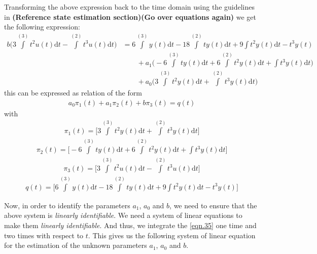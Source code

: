 \documentclass{article}
\begin{document}
Transforming the above expression back to the time domain using the guidelines in \textbf{(Reference state estimation section)(Go over equations again)} we get the following expression:
\begin{equation}\label{eqn.34}
\begin{split}
b\big(3 \int\limits^{(3)} t^2 u(t) \mathrm{d}t - \int\limits^{(2)} t^3 u(t) \mathrm{d}t\big) & = 6\int\limits^{(3)}y(t) \mathrm{d}t - 18\int\limits^{(2)}ty(t)\mathrm{d}t + 9\int t^2y(t)\mathrm{d}t - t^3y(t)  \, \\
&\qquad{}+ a_{1}\big(-6\int\limits^{(3)} ty(t)\mathrm{d}t + 6\int\limits^{(2)}t^2y(t) \mathrm{d}t + \int t^3y(t)\mathrm{d}t\big) \, \\ 
&\qquad{}+ a_{0}\big(3\int\limits^{(3)}t^2y(t)\mathrm{d}t + \int\limits^{(2)}t^3y(t)\mathrm{d}t\big)
\end{split}
\end{equation}
this can be expressed as relation of the form
\begin{equation}\label{eqn.35}
\begin{split}
a_{0}\pi_{1}(t) + a_{1}\pi_{2}(t) + b\pi_{3}(t) = q(t)
\end{split}
\end{equation}
with
\begin{align*}
\pi_{1}(t) = \bigg[3\int\limits^{(3)}t^2y(t)\mathrm{d}t + \int\limits^{(2)}t^3y(t)\mathrm{d}t\bigg]
\end{align*}
\begin{align*}
\pi_{2}(t) = \bigg[-6\int\limits^{(3)} ty(t)\mathrm{d}t + 6\int\limits^{(2)}t^2y(t) \mathrm{d}t + \int t^3y(t)\mathrm{d}t\bigg]
\end{align*}
\begin{align*}
\pi_{3} (t) = \bigg[3 \int\limits^{(3)} t^2 u(t) \mathrm{d}t - \int\limits^{(2)} t^3 u(t) \mathrm{d}t \bigg]
\end{align*}
\begin{align*}
q(t) = \bigg[ 6\int\limits^{(3)}y(t) \mathrm{d}t - 18\int\limits^{(2)}ty(t)\mathrm{d}t + 9\int t^2y(t)\mathrm{d}t - t^3y(t) \bigg]
\end{align*}
\par Now, in order to identify the parameters $a_{1}$, $a_{0}$ and $b$, we need to ensure that the above system is \textit{linearly identifiable}. We need a system of linear equations to make them \textit{linearly identifiable}. And thus, we integrate the \eqref{eqn.35} one time and two times with respect to $t$. This gives us the following system of linear equation for the estimation of the unknown parameters $a_{1}$, $a_{0}$ and $b$.
\end{document}
